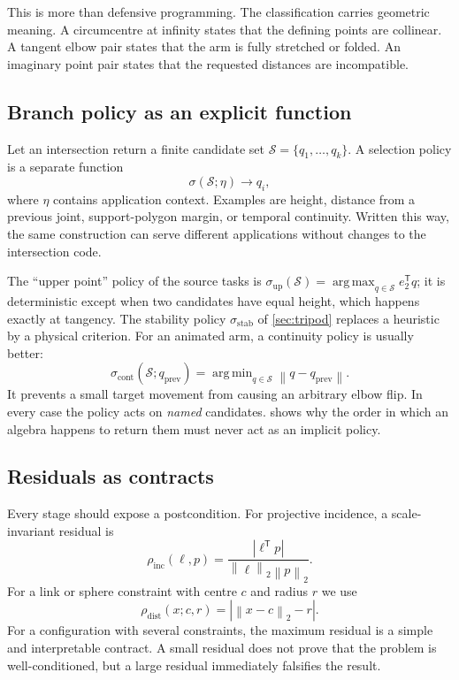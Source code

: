 \documentclass[11pt,a4paper]{article}
\theoremstyle{plain}
\theoremstyle{definition}
\theoremstyle{remark}
\newcommand{\T}{\mathsf{T}}
\newcommand{\norm}[1]{\left\lVert#1\right\rVert}
\newcommand{\abs}[1]{\left\lvert#1\right\rvert}
\DeclareMathOperator*{\argmax}{arg\,max}
\DeclareMathOperator*{\argmin}{arg\,min}
\begin{document}
This is more than defensive programming. The classification carries geometric
meaning. A circumcentre at infinity states that the defining points are
collinear. A tangent elbow pair states that the arm is fully stretched or
folded. An imaginary point pair states that the requested distances are
incompatible.

\subsection{Branch policy as an explicit function}

Let an intersection return a finite candidate set
$\mathcal S=\{q_1,\ldots,q_k\}$. A selection policy is a separate function
\begin{equation}
  \sigma(\mathcal S;\eta)\longrightarrow q_i ,
  \label{eq:selection-policy}
\end{equation}
where $\eta$ contains application context. Examples are height, distance from a
previous joint, support-polygon margin, or temporal continuity. Written this
way, the same construction can serve different applications without changes to
the intersection code.

The ``upper point'' policy of the source tasks is
$\sigma_{\mathrm{up}}(\mathcal S)=\argmax_{q\in\mathcal S}e_2^{\T}q$; it is
deterministic except when two candidates have equal height, which happens
exactly at tangency. The stability policy $\sigma_{\mathrm{stab}}$ of
\cref{sec:tripod} replaces a heuristic by a physical criterion. For an animated
arm, a continuity policy is usually better:
\begin{equation}
  \sigma_{\mathrm{cont}}(\mathcal S;q_{\mathrm{prev}})
  =\argmin_{q\in\mathcal S}\norm{q-q_{\mathrm{prev}}} .
  \label{eq:continuity-policy}
\end{equation}
It prevents a small target movement from causing an arbitrary elbow flip. In
every case the policy acts on \emph{named} candidates.  shows
why the order in which an algebra happens to return them must never act as an
implicit policy.

\subsection{Residuals as contracts}

Every stage should expose a postcondition. For projective incidence, a
scale-invariant residual is
\begin{equation}
  \rho_{\mathrm{inc}}(\ell,p)=
  \frac{\abs{\ell^{\T}p}}{\norm{\ell}_2\norm{p}_2} .
  \label{eq:incidence-residual}
\end{equation}
For a link or sphere constraint with centre $c$ and radius $r$ we use
\begin{equation}
  \rho_{\mathrm{dist}}(x;c,r)=\abs{\norm{x-c}_2-r} .
  \label{eq:distance-residual}
\end{equation}
For a configuration with several constraints, the maximum residual is a simple
and interpretable contract. A small residual does not prove that the problem is
well-conditioned, but a large residual immediately falsifies the result.
\end{document}
